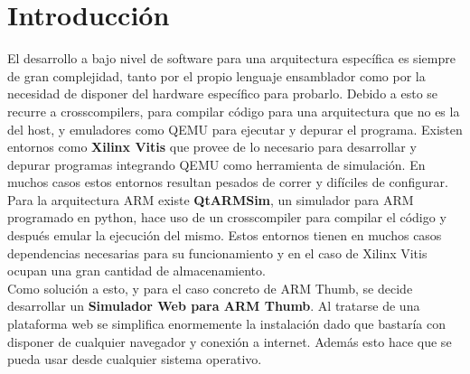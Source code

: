 \section{Introducción}
{
    El desarrollo a bajo nivel de software para una arquitectura específica es siempre de gran complejidad, tanto por el propio lenguaje ensamblador como por la necesidad de disponer del hardware
    específico para probarlo. Debido a esto se recurre a crosscompilers, para compilar código para una arquitectura que no es la del host, y emuladores como QEMU para ejecutar y depurar el programa.
    Existen entornos como \textbf{Xilinx Vitis} que provee de lo necesario para desarrollar y depurar programas integrando QEMU como herramienta de simulación.
    En muchos casos estos entornos resultan pesados de correr y difíciles de configurar. \\

    Para la arquitectura ARM existe \textbf{QtARMSim}, un simulador para ARM programado en python, hace uso de un crosscompiler para compilar el código y después emular la ejecución del mismo.
    Estos entornos tienen en muchos casos dependencias necesarias para su funcionamiento y en el caso de Xilinx Vitis ocupan una gran cantidad de almacenamiento. \\
    

    Como solución a esto, y para el caso concreto de ARM Thumb, se decide desarrollar un \textbf{Simulador Web para ARM Thumb}.
    Al tratarse de una plataforma web se simplifica enormemente la instalación dado que bastaría con disponer de cualquier navegador y conexión a internet. Además esto hace que se pueda usar desde cualquier sistema operativo. \\
    
}
